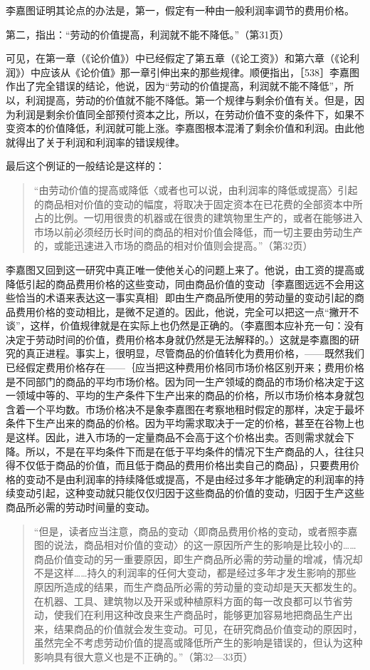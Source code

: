 李嘉图证明其论点的办法是，第一，假定有一种由一般利润率调节的费用价格。

第二，指出：“劳动的价值提高，利润就不能不降低。”（第31页）

可见，在第一章（《论价值》）中已经假定了第五章（《论工资》）和第六章（《论利润》）中应该从《论价值》那一章引伸出来的那些规律。顺便指出，［538］李嘉图作出了完全错误的结论，他说，因为“劳动的价值提高，利润就不能不降低”，所以，利润提高，劳动的价值就不能不降低。第一个规律与剩余价值有关。但是，因为利润是剩余价值同全部预付资本之比，所以，在劳动价值不变的条件下，如果不变资本的价值降低，利润就可能上涨。李嘉图根本混淆了剩余价值和利润。由此他就得出了关于利润和利润率的错误规律。

最后这个例证的一般结论是这样的：

\begin{quote}{“由劳动价值的提高或降低〈或者也可以说，由利润率的降低或提高〉引起的商品相对价值的变动的幅度，将取决于固定资本在已花费的全部资本中所占的比例。一切用很贵的机器或在很贵的建筑物里生产的，或者在能够进入市场以前必须经历长时间的商品的相对价值会降低，而一切主要由劳动生产的，或能迅速进入市场的商品的相对价值则会提高。”（第32页）}\end{quote}

李嘉图又回到这一研究中真正唯一使他关心的问题上来了。他说，由工资的提高或降低引起的商品费用价格的这些变动，同由商品价值的变动｛李嘉图远远不会用这些恰当的术语来表达这一事实真相｝即由生产商品所使用的劳动量的变动引起的商品费用价格的变动相比，是微不足道的。因此，他说，完全可以把这一点“撇开不谈”，这样，价值规律就是在实际上也仍然是正确的。（李嘉图本应补充一句：没有决定于劳动时间的价值，费用价格本身就仍然是无法解释的。）这就是李嘉图的研究的真正进程。事实上，很明显，尽管商品的价值转化为费用价格，——既然我们已经假定费用价格存在——｛应当把这种费用价格同市场价格区别开来；费用价格是不同部门的商品的平均市场价格。因为同一生产领域的商品的市场价格决定于这一领域中等的、平均的生产条件下生产出来的商品的价格，所以市场价格本身就包含着一个平均数。市场价格决不是象李嘉图在考察地租时假定的那样，决定于最坏条件下生产出来的商品的价格。因为平均需求取决于一定的价格，甚至在谷物上也是这样。因此，进入市场的一定量商品不会高于这个价格出卖。否则需求就会下降。所以，不是在平均条件下而是在低于平均条件的情况下生产商品的人，往往只得不仅低于商品的价值，而且低于商品的费用价格出卖自己的商品｝，只要费用价格的变动不是由利润率的持续降低或提高，不是由经过多年才能确定的利润率的持续变动引起，这种变动就只能仅仅归因于这些商品的价值的变动，归因于生产这些商品所必需的劳动时间量的变动。

\begin{quote}{“但是，读者应当注意，商品的变动〈即商品费用价格的变动，或者照李嘉图的说法，商品相对价值的变动〉的这一原因所产生的影响是比较小的……商品价值变动的另一重要原因，即生产商品所必需的劳动量的增减，情况却不是这样……持久的利润率的任何大变动，都是经过多年才发生影响的那些原因所造成的结果，而生产商品所必需的劳动量的变动却是天天都发生的。在机器、工具、建筑物以及开采或种植原料方面的每一改良都可以节省劳动，使我们在利用这种改良来生产商品时，能够更加容易地把商品生产出来，结果商品的价值就会发生变动。可见，在研究商品价值变动的原因时，虽然完全不考虑劳动价值的提高或降低所产生的影响是错误的，但认为这种影响具有很大意义也是不正确的。”（第32—33页）}\end{quote}

